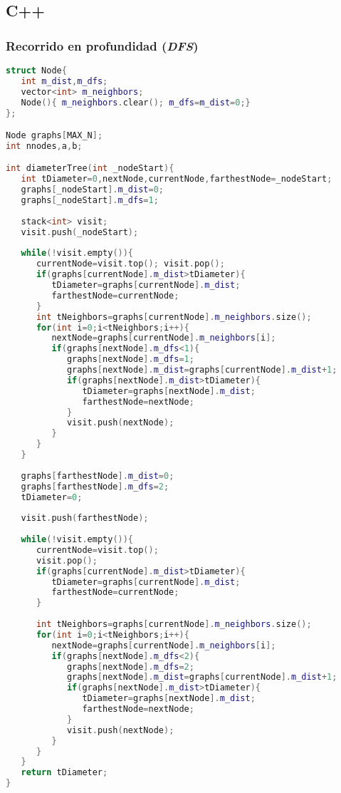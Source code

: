\subsection{C++}

\subsubsection{Recorrido en profundidad (\emph{DFS})}
\begin{lstlisting}[language=C++]
struct Node{
   int m_dist,m_dfs;
   vector<int> m_neighbors;
   Node(){ m_neighbors.clear(); m_dfs=m_dist=0;}
};

Node graphs[MAX_N];
int nnodes,a,b;

int diameterTree(int _nodeStart){
   int tDiameter=0,nextNode,currentNode,farthestNode=_nodeStart;
   graphs[_nodeStart].m_dist=0;
   graphs[_nodeStart].m_dfs=1;
	
   stack<int> visit;
   visit.push(_nodeStart);
	
   while(!visit.empty()){
      currentNode=visit.top(); visit.pop();
      if(graphs[currentNode].m_dist>tDiameter){
         tDiameter=graphs[currentNode].m_dist;
         farthestNode=currentNode;
      }
      int tNeighbors=graphs[currentNode].m_neighbors.size();
      for(int i=0;i<tNeighbors;i++){
         nextNode=graphs[currentNode].m_neighbors[i];
         if(graphs[nextNode].m_dfs<1){
            graphs[nextNode].m_dfs=1;
            graphs[nextNode].m_dist=graphs[currentNode].m_dist+1;
            if(graphs[nextNode].m_dist>tDiameter){
               tDiameter=graphs[nextNode].m_dist;
               farthestNode=nextNode;
            }
            visit.push(nextNode);
         }
      }
   }
   
   graphs[farthestNode].m_dist=0;
   graphs[farthestNode].m_dfs=2;
   tDiameter=0;
	
   visit.push(farthestNode);
	
   while(!visit.empty()){
      currentNode=visit.top();
      visit.pop();
      if(graphs[currentNode].m_dist>tDiameter){
         tDiameter=graphs[currentNode].m_dist;
         farthestNode=currentNode;
      }
		
      int tNeighbors=graphs[currentNode].m_neighbors.size();
      for(int i=0;i<tNeighbors;i++){
         nextNode=graphs[currentNode].m_neighbors[i];
         if(graphs[nextNode].m_dfs<2){
            graphs[nextNode].m_dfs=2;
            graphs[nextNode].m_dist=graphs[currentNode].m_dist+1;
            if(graphs[nextNode].m_dist>tDiameter){
               tDiameter=graphs[nextNode].m_dist;
               farthestNode=nextNode;
            }
            visit.push(nextNode);
         }
      }
   }
   return tDiameter;
}
\end{lstlisting} 

